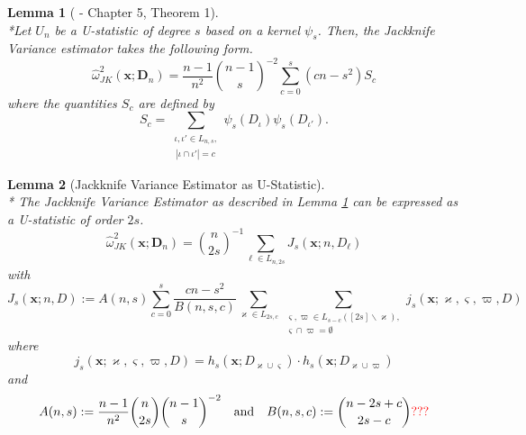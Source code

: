 \documentclass[letterpaper,10pt]{article}
\numberwithin{equation}{section}
\numberwithin{thm}{section}
\newtheorem{lem}{Lemma}
\numberwithin{lem}{section}
\numberwithin{cor}{section}
\renewcommand{\hat}{\widehat}
\newcommand{\1}{\mathbb{1}}
\begin{document}
\begin{lem}[\citet{lee_u-statistics_2019} - Chapter 5, Theorem 1]\mbox{}\\*\label{Lee_ch5thm1}
	Let $U_n$ be a U-statistic of degree $s$ based on a kernel $\psi_s$.
	Then, the Jackknife Variance estimator takes the following form.
	\begin{equation}
		\hat{\omega}^{2}_{JK}\left(\mathbf{x}; \mathbf{D}_n\right)
		= \frac{n-1}{n^2}\binom{n-1}{s}^{-2}\sum_{c = 0}^{s}\left(cn - s^2\right)S_c
	\end{equation}
	where the quantities $S_c$ are defined by
	\begin{equation}
		S_c
		= \sum_{\substack{\iota, \iota' \in L_{n,s}, \\ \, |\iota \cap \iota'| = c}}
		\psi_{s}(D_{\iota})\psi_{s}(D_{\iota'}).
	\end{equation}
\end{lem}

\begin{lem}[Jackknife Variance Estimator as U-Statistic]\label{JK_as_U_Stat}\mbox{}\\*
	The Jackknife Variance Estimator as described in Lemma \ref{Lee_ch5thm1} can be expressed as a U-statistic of order $2s$.
	\begin{equation}
		\hat{\omega}^{2}_{JK}\left(\mathbf{x}; \mathbf{D}_n\right)
		= \binom{n}{2s}^{-1} \sum_{\ell \in L_{n, 2 s}}J_{s}\left(\mathbf{x}; n, D_\ell\right)
	\end{equation}
	with
	\begin{equation}
		J_{s}\left(\mathbf{x}; n, D\right)
		:= A(n, s)
		\sum_{c = 0}^{s} \frac{cn - s^2}{B(n, s, c)}
		\sum_{\varkappa \in L_{2 s, c}}
		\sum_{\substack{\varsigma, \varpi \in L_{s - c}([2 s] \backslash \varkappa),\\
				\varsigma \cap \varpi = \emptyset}}
		j_{s}\left(\mathbf{x}; \varkappa, \varsigma, \varpi, D\right)
	\end{equation}
	where
	\begin{equation}
		j_{s}\left(\mathbf{x}; \varkappa, \varsigma, \varpi, D\right) =
		h_{s}(\mathbf{x}; D_{\varkappa \cup \varsigma}) \cdot
		h_{s}(\mathbf{x};D_{\varkappa \cup \varpi})
	\end{equation}
	and
	\begin{equation}
		A(n, s) := \frac{n-1}{n^2} \binom{n}{2s} \binom{n-1}{s}^{-2}
		\quad \text{and} \quad
		B(n, s, c) := \binom{n-2s+c}{2s - c}{\color{red} \text{???}}
	\end{equation}
\end{lem}
\end{document}
